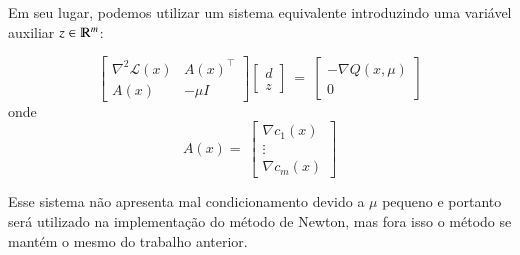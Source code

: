     Em seu lugar, podemos utilizar um sistema equivalente introduzindo uma variável
    auxiliar $z \in \varmathbb{R}^m$:

    \begin{equation*}
        \begin{bmatrix}
            \nabla^2 \mathcal{L}(x) & A(x)^\top \\
            A(x) & -\mu I
        \end{bmatrix}
        \begin{bmatrix}
            d \\
            z
        \end{bmatrix} \
        = \
        \begin{bmatrix}
            -\nabla Q(x, \mu) \\
            0
        \end{bmatrix}
    \end{equation*}
    onde
    \begin{equation*}
        A(x) = \
        \begin{bmatrix}
            \nabla c_1(x) \\
            \vdots \\
            \nabla c_m(x)
        \end{bmatrix}
    \end{equation*}

    Esse sistema não apresenta mal condicionamento devido a
    $\mu$ pequeno e portanto será utilizado na implementação do método de Newton,
    mas fora isso o método se mantém o mesmo do trabalho anterior.
